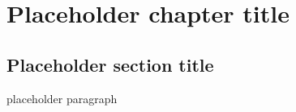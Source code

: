 \chapter{Placeholder chapter title}
\thispagestyle{fancy}

\section{Placeholder section title}

placeholder paragraph

